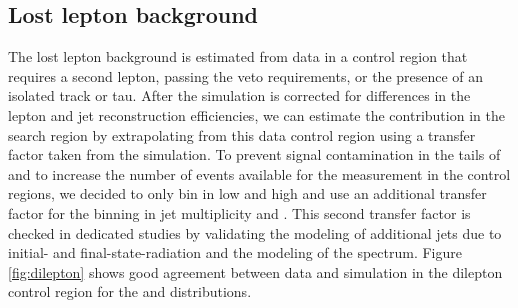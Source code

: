\subsection{Lost lepton background}\label{sec:dilepton}
The lost lepton background is estimated from data in a control region that requires a second lepton, passing the veto requirements, or the presence of an isolated track or tau.  After the simulation is corrected for differences in the lepton and jet reconstruction efficiencies, we can estimate the contribution in the search region by extrapolating from this data control region using a transfer factor taken from the simulation.   To prevent signal contamination in the tails of \MET and to increase the number of events available for the measurement in the control regions, we decided to only bin in low and high \MTtW and use an additional transfer factor for the binning in jet multiplicity and \MET. This second transfer factor is checked in dedicated studies by validating the modeling of additional jets due to initial- and final-state-radiation and the modeling of the \MET spectrum.   Figure \ref{fig:dilepton} shows good agreement between data and simulation in the dilepton control region for the \MET and \MTtW distributions.

